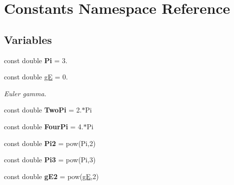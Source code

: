 \hypertarget{namespaceConstants}{\section{Constants Namespace Reference}
\label{namespaceConstants}
}
\subsection*{Variables}
\begin{DoxyCompactItemize}
\item 
\hypertarget{namespaceConstants_adb9aa880bc34f3cff694a340ad170c10}{const double {\bfseries Pi} = 3.}\label{namespaceConstants_adb9aa880bc34f3cff694a340ad170c10}

\item 
\hypertarget{namespaceConstants_a8a027fd9c5c87bae9d3571a115f6d8cf}{const double \hyperlink{namespaceConstants_a8a027fd9c5c87bae9d3571a115f6d8cf}{g\-E} = 0.}\label{namespaceConstants_a8a027fd9c5c87bae9d3571a115f6d8cf}

\begin{DoxyCompactList}\small\item\em Euler gamma. \end{DoxyCompactList}\item 
\hypertarget{namespaceConstants_aaf6799440b9624a61a8b213b21b536fb}{const double {\bfseries Two\-Pi} = 2.$\ast$Pi}\label{namespaceConstants_aaf6799440b9624a61a8b213b21b536fb}

\item 
\hypertarget{namespaceConstants_a86e62976c774f6df27fd18cf6020ceef}{const double {\bfseries Four\-Pi} = 4.$\ast$Pi}\label{namespaceConstants_a86e62976c774f6df27fd18cf6020ceef}

\item 
\hypertarget{namespaceConstants_a2819e031d2a12a5259760946c6531d25}{const double {\bfseries Pi2} = pow(Pi,2)}\label{namespaceConstants_a2819e031d2a12a5259760946c6531d25}

\item 
\hypertarget{namespaceConstants_ad4c3d7aaece345450b7f607399d9aa8f}{const double {\bfseries Pi3} = pow(Pi,3)}\label{namespaceConstants_ad4c3d7aaece345450b7f607399d9aa8f}

\item 
\hypertarget{namespaceConstants_a0fc0b0cd64b8a7161a5f246c4e133135}{const double {\bfseries g\-E2} = pow(\hyperlink{namespaceConstants_a8a027fd9c5c87bae9d3571a115f6d8cf}{g\-E},2)}\label{namespaceConstants_a0fc0b0cd64b8a7161a5f246c4e133135}


\end{DoxyCompactItemize}
